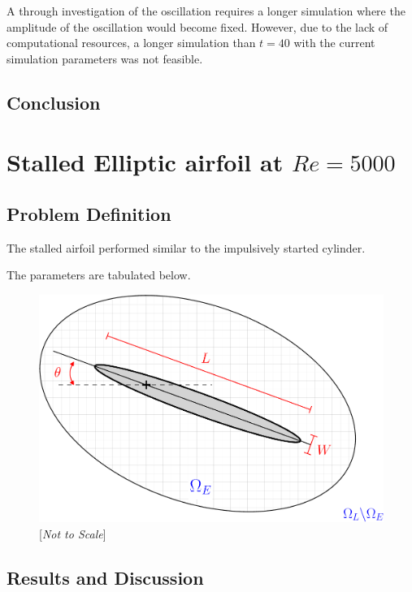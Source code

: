 A through investigation of the oscillation requires a longer simulation where the amplitude of the oscillation would become fixed. However, due to the lack of computational resources, a longer simulation than $t=40$ with the current simulation parameters was not feasible.
	
	
	
\subsection{Conclusion}	


\section{Stalled Elliptic airfoil at $Re=5000$}
\label{sec:vvhm-ea}
\subsection{Problem Definition}

The stalled airfoil performed similar to the impulsively started cylinder.

The parameters are tabulated below.

	\begin{figure}[!h]
	\showthe\columnwidth
	\centering
	\includegraphics[width=0.6\linewidth]{./figures/hybrid/ellipse/hellipticAirfoil_dd-crop.pdf}
	\caption{[\textit{Not to Scale}] }
	\label{fig:hellipticAirfoil_dd-crop}
	\end{figure}

\subsection{Results and Discussion}

